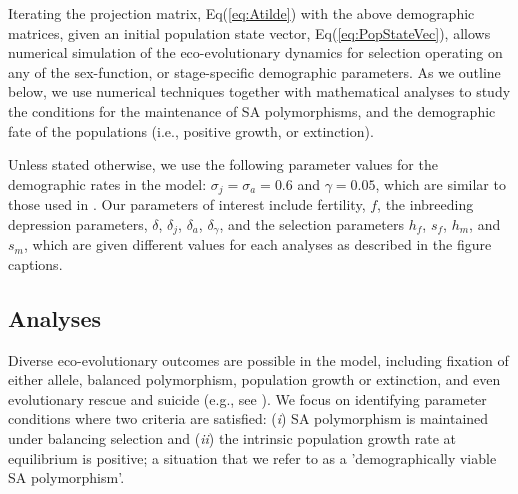 \documentclass[11pt]{article}
\begin{document}
Iterating the projection matrix, Eq(\ref{eq:Atilde}) with the above demographic matrices, given an initial population state vector, Eq(\ref{eq:PopStateVec}), allows numerical simulation of the eco-evolutionary dynamics for selection operating on any of the sex-function, or stage-specific demographic parameters. As we outline below, we use numerical techniques together with mathematical analyses to study the conditions for the maintenance of SA polymorphisms, and the demographic fate of the populations (i.e., positive growth, or extinction).

Unless stated otherwise, we use the following parameter values for the demographic rates in the model: $\sigma_j = \sigma_a = 0.6$ and $\gamma = 0.05$, which are similar to those used in \citet{deVriesCaswell2019b}. Our parameters of interest include fertility, $f$, the inbreeding depression parameters, $\delta$, $\delta_j$, $\delta_a$, $\delta_{\gamma}$, and the selection parameters $h_f$, $s_f$, $h_m$, and $s_m$, which are given different values for each analyses as described in the figure captions.

\subsection*{Analyses} \label{subsec:analyses}

Diverse eco-evolutionary outcomes are possible in the model, including fixation of either allele, balanced polymorphism, population growth or extinction, and even evolutionary rescue and suicide (e.g., see \citealt{CaswellEtAl2018,deVriesCaswell2019a,deVriesCaswell2019b}). We focus on identifying parameter conditions where two criteria are satisfied: ({\itshape i}) SA polymorphism is maintained under balancing selection and ({\itshape ii}) the intrinsic population growth rate at equilibrium is positive; a situation that we refer to as a 'demographically viable SA polymorphism'.
\end{document}
